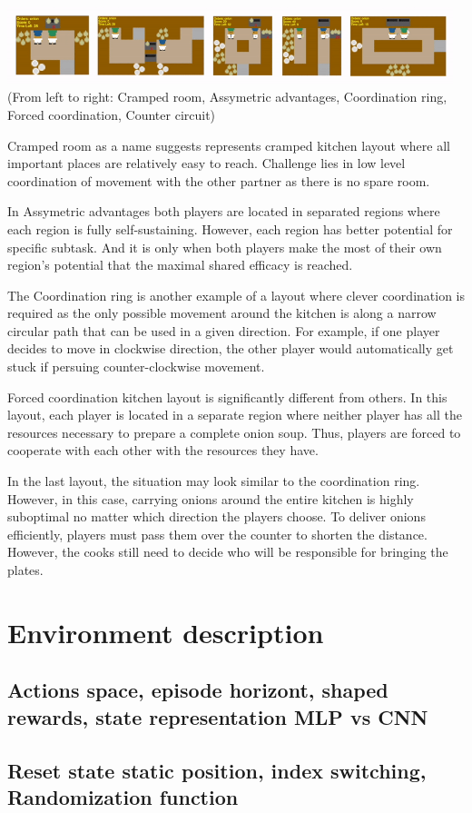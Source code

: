\includegraphics*[width=13cm]{layouts.png}
\break
(From left to right: Cramped room, Assymetric advantages, Coordination ring, Forced coordination, Counter circuit)
\par 
Cramped room as a name suggests represents cramped kitchen layout where all important places are relatively easy to reach. Challenge lies in low level coordination of movement with the other partner as there is no spare room.
\par
In Assymetric advantages both players are located in separated regions where each region is fully self-sustaining. However, each region has better potential for specific subtask. 
And it is only when both players make the most of their own region's potential that the maximal shared efficacy is reached.

\par
The Coordination ring is another example of a layout where clever coordination is required as the only possible movement around the kitchen is along a narrow circular path that can be used in a given direction.
For example, if one player decides to move in clockwise direction, the other player would automatically get stuck if persuing counter-clockwise movement.

\par
Forced coordination kitchen layout is significantly different from others. 
In this layout, each player is located in a separate region where neither player has all the resources necessary to prepare a complete onion soup. 
Thus, players are forced to cooperate with each other with the resources they have.

\par
In the last layout, the situation may look similar to the coordination ring. However, in this case, carrying onions around the entire kitchen is highly suboptimal no matter which direction the players choose. 
To deliver onions efficiently, players must pass them over the counter to shorten the distance. 
However, the cooks still need to decide who will be responsible for bringing the plates. 


\section{Environment description}
\subsection{Actions space, episode horizont, shaped rewards, state representation MLP vs CNN}
\subsection{Reset state static position, index switching, Randomization function}







